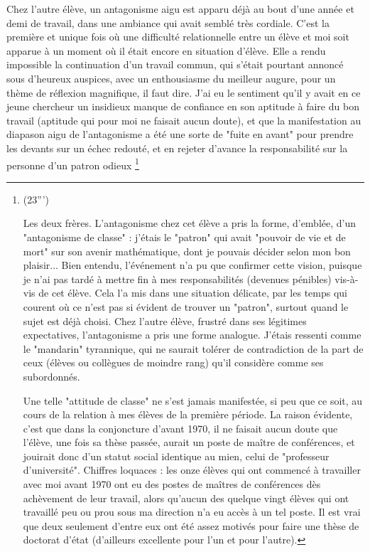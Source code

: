 Chez l'autre élève, un antagonisme aigu est apparu déjà au bout d'une année et demi de travail, dans une ambiance qui avait semblé très cordiale. C'est la première et unique fois où une difficulté relationnelle entre un élève et moi soit apparue à un moment où il était encore en situation d'élève. Elle a rendu impossible la continuation d'un travail commun, qui s'était pourtant annoncé sous d'heureux auspices, avec un enthousiasme du meilleur augure, pour un thème de réflexion magnifique, il faut dire. J'ai eu le sentiment qu'il y avait en ce jeune chercheur un insidieux manque de confiance en son aptitude à faire du bon travail (aptitude qui pour moi ne faisait aucun doute), et que la manifestation au diapason aigu de l'antagonisme a été une sorte de "fuite en avant" pour prendre les devants sur un échec redouté, et en rejeter d'avance la responsabilité sur la personne d'un patron odieux \footnote{(23''')\par Les deux frères. L'antagonisme chez cet élève a pris la forme, d'emblée, d'un "antagonisme de classe" : j'étais le "patron" qui avait "pouvoir de vie et de mort" sur son avenir mathématique, dont je pouvais décider selon mon bon plaisir... Bien entendu, l'événement n'a pu que confirmer cette vision, puisque je n'ai pas tardé à mettre fin à mes responsabilités (devenues pénibles) vis-à-vis de cet élève. Cela l'a mis dans une situation délicate, par les temps qui courent où ce n'est pas si évident de trouver un "patron", surtout quand le sujet est déjà choisi. Chez l'autre élève, frustré dans ses légitimes expectatives, l'antagonisme a pris une forme analogue. J'étais ressenti comme le "mandarin" tyrannique, qui ne saurait tolérer de contradiction de la part de ceux (élèves ou collègues de moindre rang) qu'il considère comme ses subordonnés.

Une telle "attitude de classe" ne s'est jamais manifestée, si peu que ce soit, au cours de la relation à mes élèves de la première période. La raison évidente, c'est que dans la conjoncture d'avant 1970, il ne faisait aucun doute que l'élève, une fois sa thèse passée, aurait un poste de maître de conférences, et jouirait donc d'un statut social identique au mien, celui de "professeur d'université". Chiffres loquaces : les onze élèves qui ont commencé à travailler avec moi avant 1970 ont eu des postes de maîtres de conférences dès achèvement de leur travail, alors qu'aucun des quelque vingt élèves qui ont travaillé peu ou prou sous ma direction n'a eu accès à un tel poste. Il est vrai que deux seulement d'entre eux ont été assez motivés pour faire une thèse de doctorat d'état (d'ailleurs excellente pour l'un et pour l'autre).

}
